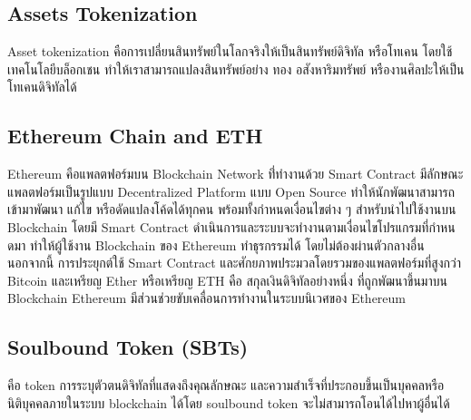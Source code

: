 \documentclass[12pt,oneside,openright,a4paper]{cpe-thai-project}
\begin{document}
\subsection{Assets Tokenization  \cite{tokenization}}
\tab Asset tokenization คือการเปลี่ยนสินทรัพย์ในโลกจริงให้เป็นสินทรัพย์ดิจิทัล หรือโทเคน โดยใช้เทคโนโลยีบล็อกเชน ทำให้เราสามารถแปลงสินทรัพย์อย่าง ทอง อสังหาริมทรัพย์ หรืองานศิลปะให้เป็นโทเคนดิจิทัลได้

\subsection{Ethereum Chain and ETH\cite{eth}}
\tab Ethereum คือแพลตฟอร์มบน Blockchain Network ที่่ทํางานด้วย Smart Contract มีลักษณะแพลตฟอร์มเป็นรูปแบบ Decentralized Platform แบบ Open Source ทําให้นักพัฒนาสามารถเข้ามาพัฒนา แก้ไข หรือดัดแปลงโค้ดได้ทุกคน พร้อมทั้งกําหนดเงื่อนไขต่าง ๆ สําหรับนําไปใช้งานบน Blockchain โดยมี Smart Contract ดําเนินการและระบบจะทํางานตามเงื่อนไขโปรแกรมที่กําหนดมา ทําให้ผู้ใช้งาน Blockchain ของ Ethereum ทําธุรกรรมได้ โดยไม่ต้องผ่านตัวกลางอื่น นอกจากนี้ การประยุกต์ใช้ Smart Contract และศักยภาพประมวลโดยรวมของแพลตฟอร์มที่สูงกว่า Bitcoin และเหรียญ Ether หรือเหรียญ ETH คือ สกุลเงินดิจิทัลอย่างหนึ่ง ที่ถูกพัฒนาขึ้นมาบน Blockchain Ethereum มีส่วนช่วยขับเคลื่อนการทํางานในระบบนิเวศของ Ethereum

\subsection{Soulbound Token (SBTs)\cite{sbts}}
\tab คือ token การระบุตัวตนดิจิทัลที่แสดงถึงคุณลักษณะ และความสำเร็จที่ประกอบขึ้นเป็นบุคคลหรือนิติบุคคลภายในระบบ blockchain ได้โดย soulbound token จะไม่สามารถโอนได้ไปหาผู้อื่นได้
\end{document}
